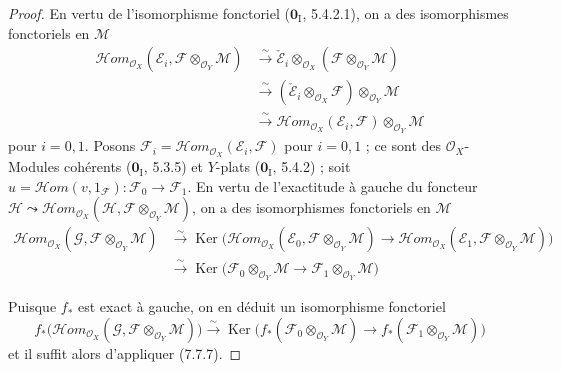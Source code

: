 \begin{proof}
En vertu de l'isomorphisme fonctoriel ($\mathbf{0}_{\mathrm I}$, 5.4.2.1), on a des
isomorphismes fonctoriels en $\mathscr M$
\begin{align*}
  \mathscr{H}\!om_{\mathscr O_X}
    (\mathscr E_i,\mathscr F\otimes_{\mathscr O_Y}\mathscr M)
  &\xrightarrow{\sim}
  \check{\mathscr E}_i
    \otimes_{\mathscr O_X}
    (\mathscr F\otimes_{\mathscr O_Y}\mathscr M)\\
  &\xrightarrow{\sim}
  (\check{\mathscr E}_i\otimes_{\mathscr O_X}\mathscr F)
    \otimes_{\mathscr O_Y}\mathscr M\\
  &\xrightarrow{\sim}
  \mathscr{H}\!om_{\mathscr O_X}(\mathscr E_i,\mathscr F)
    \otimes_{\mathscr O_Y}\mathscr M
\end{align*}
pour $i=0,1$. Posons
$\mathscr F_i=\mathscr{H}\!om_{\mathscr O_X}(\mathscr E_i,\mathscr F)$ pour
$i=0,1$ ; ce sont des $\mathscr O_X$-Modules cohérents ($\mathbf{0}_{\mathrm I}$, 5.3.5)
et $Y$-plats ($\mathbf{0}_{\mathrm I}$, 5.4.2) ; soit
$u=\mathscr{H}\!om(v,1_{\mathscr F}):\mathscr F_0\to\mathscr F_1$. En vertu de
l'exactitude à gauche du foncteur
$\mathscr H\leadsto\mathscr{H}\!om_{\mathscr O_X}
(\mathscr H,\mathscr F\otimes_{\mathscr O_Y}\mathscr M)$, on a des isomorphismes
fonctoriels en $\mathscr M$
\begin{align*}
  \mathscr{H}\!om_{\mathscr O_X}
    (\mathscr G,\mathscr F\otimes_{\mathscr O_Y}\mathscr M)
  &\xrightarrow{\sim}
  \operatorname{Ker}
  \bigl(
    \mathscr{H}\!om_{\mathscr O_X}
      (\mathscr E_0,\mathscr F\otimes_{\mathscr O_Y}\mathscr M)
    \longrightarrow
    \mathscr{H}\!om_{\mathscr O_X}
      (\mathscr E_1,\mathscr F\otimes_{\mathscr O_Y}\mathscr M)
  \bigr)\\
  &\xrightarrow{\sim}
  \operatorname{Ker}
  \bigl(
    \mathscr F_0\otimes_{\mathscr O_Y}\mathscr M
    \longrightarrow
    \mathscr F_1\otimes_{\mathscr O_Y}\mathscr M
  \bigr)
\end{align*}

Puisque $f_*$ est exact à gauche, on en déduit un isomorphisme fonctoriel
\[
  f_*
  \bigl(
    \mathscr{H}\!om_{\mathscr O_X}
      (\mathscr G,\mathscr F\otimes_{\mathscr O_Y}\mathscr M)
  \bigr)
  \xrightarrow{\sim}
  \operatorname{Ker}
  \bigl(
    f_*(\mathscr F_0\otimes_{\mathscr O_Y}\mathscr M)
    \longrightarrow
    f_*(\mathscr F_1\otimes_{\mathscr O_Y}\mathscr M)
  \bigr)
\]
et il suffit alors d'appliquer (7.7.7).
\end{proof}

